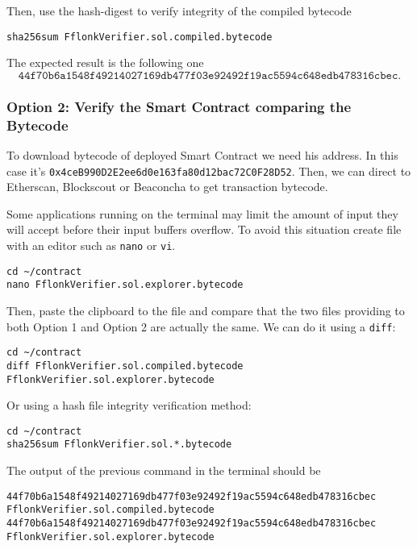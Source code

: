 Then, use the hash-digest to verify integrity of the compiled bytecode

\begin{lstlisting}[style=termt]
sha256sum FflonkVerifier.sol.compiled.bytecode
\end{lstlisting}

The expected result is the following one
\[
\texttt{44f70b6a1548f49214027169db477f03e92492f19ac5594c648edb478316cbec.}
\]


\subsubsection{Option 2: Verify the Smart Contract comparing the Bytecode}

To download bytecode of deployed Smart Contract we need his address. In this case it’s \texttt{0x4ceB990D2E2ee6d0e163fa80d12bac72C0F28D52}. Then, we can direct to Etherscan, Blockscout or Beaconcha to get transaction bytecode.

Some applications running on the terminal may limit the amount of input they will accept before their input buffers overflow. To avoid this situation create file  with an editor such as \texttt{nano} or \texttt{vi}.

\begin{lstlisting}[style=termt]
cd ~/contract
nano FflonkVerifier.sol.explorer.bytecode
\end{lstlisting}

Then, paste the clipboard to the file and compare that the two files providing to both Option 1 and Option 2 are actually the same. We can do it using a \texttt{diff}:

\begin{lstlisting}[style=termt]
cd ~/contract
diff FflonkVerifier.sol.compiled.bytecode FflonkVerifier.sol.explorer.bytecode
\end{lstlisting}


Or using a hash file integrity verification method:

\begin{lstlisting}[style=termt]
cd ~/contract
sha256sum FflonkVerifier.sol.*.bytecode
\end{lstlisting}

The output of the previous command in the terminal should be

\begin{lstlisting}[style=termt]
44f70b6a1548f49214027169db477f03e92492f19ac5594c648edb478316cbec  FflonkVerifier.sol.compiled.bytecode
44f70b6a1548f49214027169db477f03e92492f19ac5594c648edb478316cbec  FflonkVerifier.sol.explorer.bytecode
\end{lstlisting}


